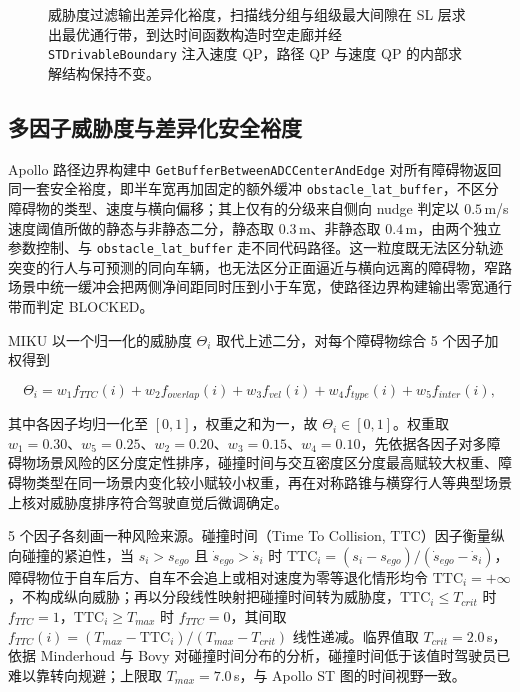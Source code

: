 \documentclass[a4paper,zihao=5]{ctexart}
\theoremstyle{definition}
\begin{document}
\begin{figure}[htbp]
\centering
{}
\caption{MIKU 显式约束传递通道的整体数据流}
\caption*{威胁度过滤输出差异化裕度，扫描线分组与组级最大间隙在 SL 层求出最优通行带，到达时间函数构造时空走廊并经 \texttt{STDrivableBoundary} 注入速度 QP，路径 QP 与速度 QP 的内部求解结构保持不变。}
\label{fig:algorithm_flow}
\end{figure}

\subsection{多因子威胁度与差异化安全裕度}
\label{sec:method_threat}

Apollo 路径边界构建中 \texttt{GetBufferBetweenADCCenterAndEdge} 对所有障碍物返回同一套安全裕度，即半车宽再加固定的额外缓冲 \texttt{obstacle\_lat\_buffer}，不区分障碍物的类型、速度与横向偏移；其上仅有的分级来自侧向 nudge 判定以 $0.5$\,m/s 速度阈值所做的静态与非静态二分，静态取 $0.3$\,m、非静态取 $0.4$\,m，由两个独立参数控制、与 \texttt{obstacle\_lat\_buffer} 走不同代码路径。这一粒度既无法区分轨迹突变的行人与可预测的同向车辆，也无法区分正面逼近与横向远离的障碍物，窄路场景中统一缓冲会把两侧净间距同时压到小于车宽，使路径边界构建输出零宽通行带而判定 BLOCKED。

MIKU 以一个归一化的威胁度 $\Theta_i$ 取代上述二分，对每个障碍物综合 5 个因子加权得到

\begin{equation}
    \Theta_i = w_1 f_{TTC}(i) + w_2 f_{overlap}(i) + w_3 f_{vel}(i) + w_4 f_{type}(i) + w_5 f_{inter}(i),
    \label{eq:threat_score}
\end{equation}

其中各因子均归一化至 $[0,1]$，权重之和为一，故 $\Theta_i \in [0,1]$。权重取 $w_1=0.30$、$w_5=0.25$、$w_2=0.20$、$w_3=0.15$、$w_4=0.10$，先依据各因子对多障碍物场景风险的区分度定性排序，碰撞时间与交互密度区分度最高赋较大权重、障碍物类型在同一场景内变化较小赋较小权重，再在对称路锥与横穿行人等典型场景上核对威胁度排序符合驾驶直觉后微调确定。

5 个因子各刻画一种风险来源。碰撞时间（Time To Collision, TTC）因子衡量纵向碰撞的紧迫性，当 $s_i > s_{ego}$ 且 $\dot{s}_{ego} > \dot{s}_i$ 时 $\mathrm{TTC}_i = (s_i - s_{ego})/(\dot{s}_{ego} - \dot{s}_i)$，障碍物位于自车后方、自车不会追上或相对速度为零等退化情形均令 $\mathrm{TTC}_i=+\infty$，不构成纵向威胁；再以分段线性映射把碰撞时间转为威胁度，$\mathrm{TTC}_i \leq T_{crit}$ 时 $f_{TTC}=1$，$\mathrm{TTC}_i \geq T_{max}$ 时 $f_{TTC}=0$，其间取 $f_{TTC}(i) = (T_{max} - \mathrm{TTC}_i)/(T_{max} - T_{crit})$ 线性递减。临界值取 $T_{crit}=2.0$\,s，依据 Minderhoud 与 Bovy 对碰撞时间分布的分析\citep{minderhoud2001extended}，碰撞时间低于该值时驾驶员已难以靠转向规避；上限取 $T_{max}=7.0$\,s，与 Apollo ST 图的时间视野一致。
\end{document}
